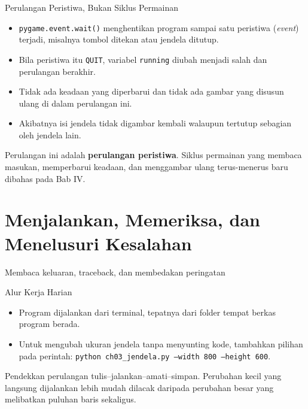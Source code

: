 \documentclass[aspectratio=169,10pt]{beamer}
\begin{document}
\begin{frame}{Perulangan Peristiwa, Bukan Siklus Permainan}
\begin{itemize}
  \item \texttt{pygame.event.wait()} menghentikan program sampai satu peristiwa
        (\emph{event}) terjadi, misalnya tombol ditekan atau jendela ditutup.
  \item Bila peristiwa itu \texttt{QUIT}, variabel \texttt{running} diubah
        menjadi salah dan perulangan berakhir.
  \item Tidak ada keadaan yang diperbarui dan tidak ada gambar yang disusun
        ulang di dalam perulangan ini.
  \item Akibatnya isi jendela tidak digambar kembali walaupun tertutup sebagian
        oleh jendela lain.
\end{itemize}
\vspace{0.2cm}
\begin{peringatan}
Perulangan ini adalah \textbf{perulangan peristiwa}. Siklus permainan yang
membaca masukan, memperbarui keadaan, dan menggambar ulang terus-menerus baru
dibahas pada Bab IV.
\end{peringatan}
\end{frame}

\section{Menjalankan, Memeriksa, dan Menelusuri Kesalahan}
  {Membaca keluaran, traceback, dan membedakan peringatan}

\begin{frame}{Alur Kerja Harian}
\centering
{}
\vspace{0.14cm}
\begin{itemize}
  \item Program dijalankan dari terminal, tepatnya dari folder tempat berkas
        program berada.
  \item Untuk mengubah ukuran jendela tanpa menyunting kode, tambahkan pilihan
        pada perintah: \texttt{python ch03\_jendela.py --width 800 --height 600}.
\end{itemize}
\begin{kotak}
Pendekkan perulangan tulis--jalankan--amati--simpan. Perubahan kecil yang
langsung dijalankan lebih mudah dilacak daripada perubahan besar yang melibatkan
puluhan baris sekaligus.
\end{kotak}
\end{frame}
\end{document}
